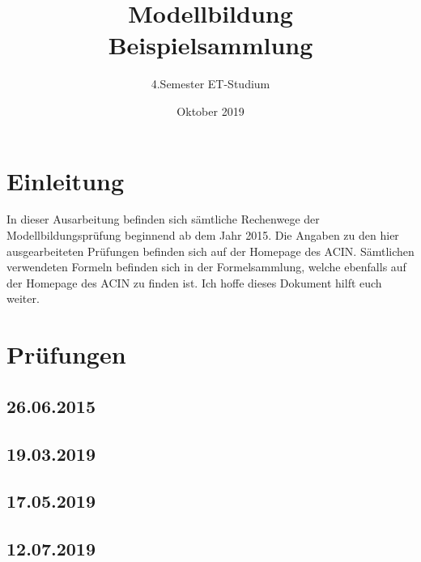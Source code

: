 \documentclass[a4paper,12p]{article}
\title{\huge Modellbildung\\\large \huge Beispielsammlung}
\author{\huge 4.Semester ET-Studium}
\date{\huge Oktober 2019}
\begin{document}
	
	\maketitle
	\newpage
	\tableofcontents
	\newpage
	
	\section{Einleitung}
	In dieser Ausarbeitung befinden sich sämtliche Rechenwege der Modellbildungsprüfung beginnend ab dem Jahr 2015. Die Angaben zu den hier ausgearbeiteten Prüfungen befinden sich auf der Homepage des ACIN. Sämtlichen verwendeten Formeln befinden sich in der Formelsammlung, welche ebenfalls auf der Homepage des ACIN zu finden ist. Ich hoffe dieses Dokument hilft euch weiter. 
	
	\section{Prüfungen}
	
	\subsection{26.06.2015}
	
	\newpage
	\subsection{19.03.2019}
		
	
%	
%	
	\newpage	
	\subsection{17.05.2019}
	
	
	
	\newpage
	\subsection{12.07.2019}
	
	
	
	
\end{document}
